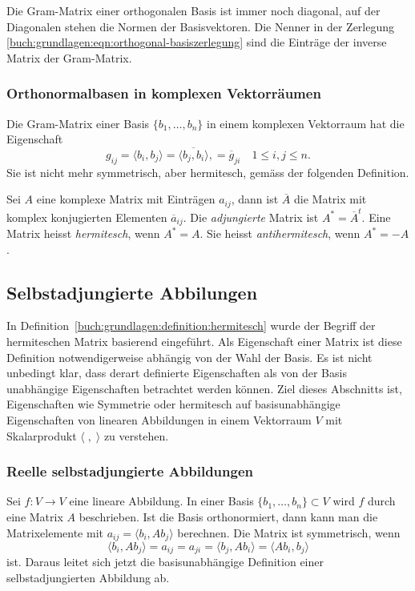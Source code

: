 Die Gram-Matrix einer orthogonalen Basis ist immer noch diagonal,
auf der Diagonalen stehen die Normen der Basisvektoren.
Die Nenner in der Zerlegung
\eqref{buch:grundlagen:eqn:orthogonal-basiszerlegung}
sind die Einträge der inverse Matrix der Gram-Matrix.

\subsubsection{Orthonormalbasen in komplexen Vektorräumen}
Die Gram-Matrix einer Basis $\{b_1,\dots,b_n\}$ in einem komplexen
Vektorraum hat die Eigenschaft
\[
g_{i\!j}
=
\langle b_i,b_j\rangle
=
\overline{\langle b_j,b_i\rangle},
=
\overline{g}_{ji}
\quad 1\le i,j\le n.
\]
Sie ist nicht mehr symmetrisch, aber hermitesch, gemäss 
der folgenden Definition.

\begin{definition}
\label{buch:grundlagen:definition:hermitesch}
Sei $A$ eine komplexe Matrix mit Einträgen $a_{i\!j}$, dann ist
$\overline{A}$ die Matrix mit komplex konjugierten Elementen
$\overline{a}_{i\!j}$.
Die {\em adjungierte} Matrix ist $A^*=\overline{A}^t$.
%
Eine Matrix heisst {\em hermitesch}, wenn $A^*=A$.
%
Sie heisst {\em antihermitesch}, wenn $A^*=-A$.
\end{definition}

\subsection{Selbstadjungierte Abbilungen
\label{buch:subsection:selbstadjungiert}}
In Definition~\ref{buch:grundlagen:definition:hermitesch}
wurde der Begriff der hermiteschen Matrix basierend
eingeführt.
Als Eigenschaft einer Matrix ist diese Definition notwendigerweise
abhängig von der Wahl der Basis.
Es ist nicht unbedingt klar, dass derart definierte Eigenschaften
als von der Basis unabhängige Eigenschaften betrachtet werden können.
Ziel dieses Abschnitts ist, Eigenschaften wie Symmetrie oder
hermitesch auf basisunabhängige Eigenschaften von
linearen Abbildungen in einem Vektorraum $V$ mit Skalarprodukt
$\langle\;,\;\rangle$ zu verstehen.

\subsubsection{Reelle selbstadjungierte Abbildungen}
Sei $f\colon V\to V$ eine lineare Abbildung.
In einer Basis $\{b_1,\dots,b_n\}\subset V$ wird $f$ durch eine
Matrix $A$ beschrieben.
Ist die Basis orthonormiert, dann kann man die Matrixelemente 
mit $a_{i\!j}=\langle b_i,Ab_j\rangle$ berechnen.
Die Matrix ist symmetrisch, wenn 
\[
\langle b_i,Ab_j\rangle
=
a_{i\!j}
= 
a_{ji}
=
\langle b_j,Ab_i \rangle
=
\langle Ab_i,b_j \rangle
\]
ist.
Daraus leitet sich jetzt die basisunabhängige Definition einer
selbstadjungierten Abbildung ab.

